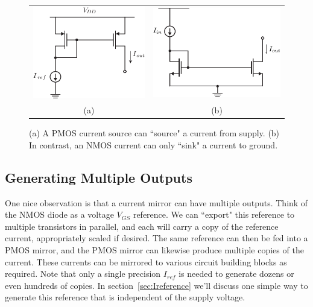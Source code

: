 \begin{figure}[tb]
\begin{center}
\begin{tabular}{cc}
\includegraphics[scale=1]{18mirror_pmos.pdf} &
\includegraphics[scale=1]{nmos_source_mirror} \\ 
(a) & (b) \\
\end{tabular}
\end{center}
\caption{(a) A PMOS current source can ``source" a current from supply.  (b) In contrast, an NMOS current can only ``sink" a current to ground.} \label{fig:18mirror_pmos.pdf}
\end{figure}




\subsection{Generating Multiple Outputs}



One nice observation is that a current mirror can have multiple outputs.  Think of the NMOS diode as a voltage $V_{GS}$ reference.  We can ``export" this reference to multiple transistors in parallel, and each will carry a copy of the reference current, appropriately scaled if desired.  The same reference can then be fed into a PMOS mirror, and the PMOS mirror can likewise produce multiple copies of the current.  These currents can be mirrored to various circuit building blocks as required.  Note that only a single precision $I_{ref}$ is needed to generate dozens or even hundreds of copies.  In section~\ref{sec:Ireference} we'll discuss one simple way to generate this reference that is independent of the supply voltage.

